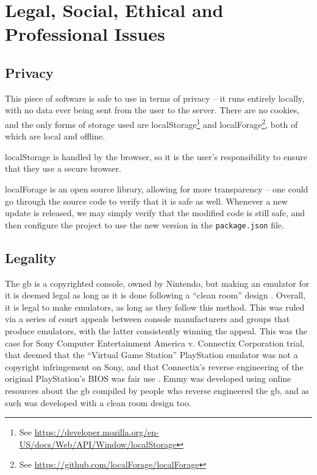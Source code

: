 \documentclass[11pt]{informatics-report}
\newcommand{\ftnt}[1]{\footnote{See \url{#1}}}
\begin{document}
\chapter{Legal, Social, Ethical and Professional Issues}

\section{Privacy}

This piece of software is safe to use in terms of privacy -- it runs entirely locally, with no data ever being sent from the user to the server. There are no cookies, and the only forms of storage used are localStorage\ftnt{https://developer.mozilla.org/en-US/docs/Web/API/Window/localStorage} and localForage\ftnt{https://github.com/localForage/localForage}, both of which are local and offline.

localStorage is handled by the browser, so it is the user's responsibility to ensure that they use a secure browser.

localForage is an open source library, allowing for more transparency -- one could go through the source code to verify that it is safe as well. Whenever a new update is released, we may simply verify that the modified code is still safe, and then configure the project to use the new version in the \texttt{package.json} file.

\section{Legality}

The \glsdesc{gb} is a copyrighted console, owned by Nintendo, but making an emulator for it is deemed legal as long as it is done following a ``clean room'' design \cite{emulation_white_paper}. Overall, it is legal to make emulators, as long as they follow this method. This was ruled via a series of court appeals between console manufacturers and groups that produce emulators, with the latter consistently winning the appeal. This was the case for Sony Computer Entertainment America v. Connectix Corporation trial, that deemed that the ``Virtual Game Station'' PlayStation emulator was not a copyright infringement on Sony, and that Connectix's reverse engineering of the original PlayStation's BIOS was fair use \cite{sony_v_connectix}. Emmy was developed using online resources about the \gls{gb} compiled by people who reverse engineered the \gls{gb}, and as such was developed with a clean room design too.
\end{document}
